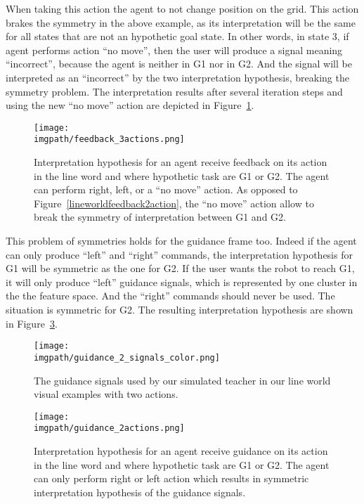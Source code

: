 When taking this action the agent to not change position on the grid. This action brakes the symmetry in the above example, as its interpretation will be the same for all states that are not an hypothetic goal state. In other words, in state 3, if agent performs action ``no move'', then the user will produce a signal meaning ``incorrect'', because the agent is neither in G1 nor in G2. And the signal will be interpreted as an ``incorrect'' by the two interpretation hypothesis, breaking the symmetry problem. The interpretation results after several iteration steps and using the new ``no move'' action are depicted in Figure~\ref{fig:lineworldfeedback3action}.

\begin{figure}[!ht]
  \centering
  \texttt{[image: \\imgpath/feedback\_3actions.png]}
  \caption{Interpretation hypothesis for an agent receive feedback on its action in the line word and where hypothetic task are G1 or G2. The agent can perform right, left, or a ``no move'' action. As opposed to Figure~\ref{lineworldfeedback2action}, the ``no move'' action allow to break the symmetry of interpretation between G1 and G2.}
  \label{fig:lineworldfeedback3action}
\end{figure}

This problem of symmetries holds for the guidance frame too. Indeed if the agent can only produce ``left'' and ``right'' commands, the interpretation hypothesis for G1 will be symmetric as the one for G2. If the user wants the robot to reach G1, it will only produce ``left'' guidance signals, which is represented by one cluster in the the feature space. And the ``right'' commands should never be used. The situation is symmetric for G2. The resulting interpretation hypothesis are shown in Figure~\ref{fig:lineworldguidance2action}.

\begin{figure}[!ht]
  \centering
  \texttt{[image: \\imgpath/guidance\_2\_signals\_color.png]}
  \caption{The guidance signals used by our simulated teacher in our line world visual examples with two actions.}
  \label{fig:lineworldguidance2signals}
\end{figure}

\begin{figure}[!ht]
  \centering
  \texttt{[image: \\imgpath/guidance\_2actions.png]}
  \caption{Interpretation hypothesis for an agent receive guidance on its action in the line word and where hypothetic task are G1 or G2. The agent can only perform right or left action which results in symmetric interpretation hypothesis of the guidance signals.}
  \label{fig:lineworldguidance2action}
\end{figure}

